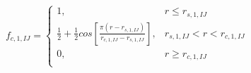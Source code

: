 \documentclass[12pt]{article}
\begin{document}
\begin{eqnarray*}
f_{c,1,IJ}=\left\{\begin{array}{lr}
1, & r\leq r_{s,1,IJ} \\
\frac{1}{2}+\frac{1}{2} cos \left[\frac{\pi \left(r-r_{s,1,IJ}\right)}{r_{c,1,IJ}-r_{s,1,IJ}}\right], & r_{s,1,IJ}<r<r_{c,1,IJ} \\
0, & r \geq r_{c,1,IJ} \\
\end{array}\right.
\end{eqnarray*} 
\end{document}
